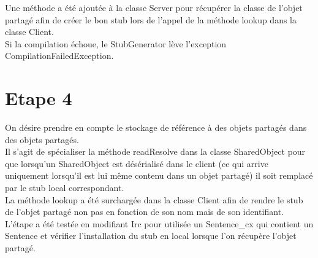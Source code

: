\documentclass[a4paper,12pt]{article}
\begin{document}
Une méthode a été ajoutée à la classe Server pour récupérer la classe de l'objet partagé afin de créer le bon stub lors de l'appel de la méthode lookup dans la classe Client.\\

Si la compilation échoue, le StubGenerator lève l'exception CompilationFailedException.


\clearpage
\section{Etape 4}

\bigskip
\bigskip
\bigskip
\bigskip

On désire prendre en compte le stockage de référence à des objets partagés dans des objets partagés.\\

Il s'agit de spécialiser la méthode readResolve dans la classe SharedObject pour que lorsqu'un SharedObject est désérialisé dans le client (ce qui arrive uniquement lorsqu'il est lui même contenu dans un objet partagé) il soit remplacé par le stub local correspondant.\\

La méthode lookup a été surchargée dans la classe Client afin de rendre le stub de l'objet partagé non pas en fonction de son nom mais de son identifiant.\\

L'étape a été testée en modifiant Irc pour utilisée un Sentence\_cx qui contient un Sentence et vérifier l'installation du stub en local lorsque l'on récupère l'objet partagé.
\end{document}
